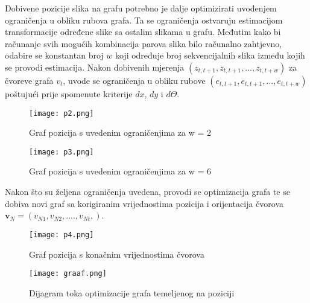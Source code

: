 \documentclass[times, utf8, diplomski]{fer}
\begin{document}
Dobivene pozicije slika na grafu potrebno je dalje optimizirati uvođenjem ograničenja u obliku rubova grafa. Ta se ograničenja ostvaruju estimacijom transformacije određene slike sa ostalim slikama u grafu. Međutim kako bi računanje svih mogućih kombinacija parova slika bilo računalno zahtjevno, odabire se konstantan broj $w$ koji određuje broj sekvencijalnih slika između kojih se provodi estimacija. Nakon dobivenih mjerenja $(z_{t,t+1},z_{t,t+1},...,z_{t,t+w})$ za čvoreve grafa $v_t$, uvode se ograničenja u obliku rubove $(e_{t,t+1},e_{t,t+1},...,e_{t,t+w})$ poštujući prije spomenute kriterije $dx$, $dy$ i $d\Theta$.
\begin{figure}[!tbh]
\centering
\texttt{[image: p2.png]}
		\caption{ Graf pozicija s uvedenim ograničenjima za w = 2}
		\label{fig:Graf pozicija,w=2}
\end{figure}
\begin{figure}[!tbh]
\centering
\texttt{[image: p3.png]}
		\caption{ Graf pozicija s uvedenim ograničenjima za w = 6}
		\label{fig:Graf pozicija, w=6}
\end{figure}
\newpage
Nakon što su željena ograničenja uvedena, provodi se optimizacija grafa te se dobiva novi graf sa korigiranim vrijednostima pozicija i orijentacija čvorova $\textbf{v}_N=(v_{N1},v_{N2},....,v_{Nt},)$.
\begin{figure}[!tbh]
\centering
\texttt{[image: p4.png]}
		\caption{ Graf pozicija s konačnim vrijednostima čvorova }
		\label{fig:Graf pozicija s konačnim vrijednostima čvorova}
\end{figure}
\begin{figure}[!tbh]
\centering
\texttt{[image: graaf.png]}
		\caption{ Dijagram toka optimizacije grafa temeljenog na poziciji}
		\label{fig:Dijagram toka optimizacije grafa temeljenog na poziciji}
\end{figure}
\end{document}
